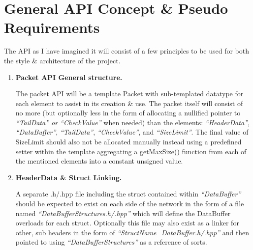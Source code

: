 \documentclass{article}
\begin{document}
\section{General API Concept \& Pseudo Requirements}
The API as I have imagined it will consist of a few principles to be used for both the style \& architecture of the project.
\begin{enumerate}
    \item \textbf{Packet API General structure.}

    The packet API will be a template Packet with sub-templated datatype for each element to assist in its creation \& use. The packet itself will consist of no more (but optionally less in the form of allocating a nullified pointer to \textit{``TailData'' or ``CheckValue''} when needed) than the elements: \textit{``HeaderData''}, \textit{``DataBuffer''}, \textit{``TailData''}, \textit{``CheckValue''}, and \textit{``SizeLimit''}. The final value of SizeLimit should also not be allocated manually instead using a predefined setter within the template aggregating a getMaxSize() function from each of the mentioned elements into a constant unsigned value.

    \item \textbf{HeaderData \& Struct Linking.}

    A separate .h/.hpp file including the struct contained within \textit{``DataBuffer''} should be expected to exist on each side of the network in the form of a file named \textit{``DataBufferStructures.h/.hpp''} which will define the DataBuffer overloads for each struct. Optionally this file may also exist as a linker for other, sub headers in the form of \textit{``StructName\_DataBuffer.h/.hpp''} and then pointed to using \textit{``DataBufferStructures''} as a reference of sorts.


\end{enumerate}
\end{document}
